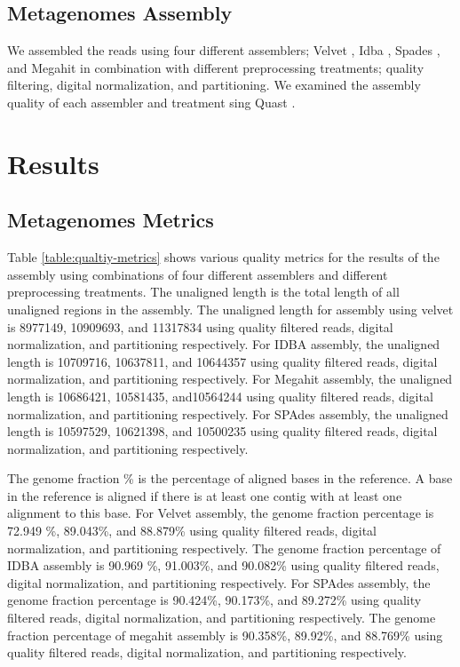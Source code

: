\subsection*{Metagenomes Assembly}
We assembled the reads using four different assemblers; Velvet \cite{velvet}, Idba \cite{idba}, Spades \cite{spades}, and Megahit \cite{megahit} in combination with different preprocessing treatments;   quality filtering, digital normalization, and partitioning. We examined the assembly quality of each assembler and treatment sing Quast \cite{quast}. 

\section*{Results}

\subsection*{Metagenomes Metrics}   
Table \ref {table:qualtiy-metrics} shows various quality metrics for the results of the assembly using combinations of four different assemblers and different preprocessing treatments.
The unaligned length is the total length of all unaligned regions in the assembly.  The unaligned length for assembly using velvet is 8977149, 10909693, and 11317834 using quality filtered reads, digital normalization, and partitioning respectively. For IDBA assembly, the unaligned length is 10709716, 10637811, and 10644357 using quality filtered reads, digital normalization, and partitioning respectively. For Megahit assembly, the unaligned length is 10686421, 10581435, and10564244 using quality filtered reads, digital normalization, and partitioning respectively.   For SPAdes assembly, the unaligned length is 10597529, 10621398, and 10500235 using quality filtered reads, digital normalization, and partitioning respectively. 

The genome fraction \% is the percentage of aligned bases in the reference. A base in the reference is aligned if there is at least one contig with at least one alignment to this base. For Velvet assembly,  the genome fraction percentage is 72.949 \%, 89.043\%, and 88.879\%  using quality filtered reads, digital normalization, and partitioning respectively. The genome fraction percentage of IDBA assembly is 90.969 \%, 91.003\%, and 90.082\% using quality filtered reads, digital normalization, and partitioning respectively.  For SPAdes assembly, the genome fraction percentage is 90.424\%, 90.173\%, and 89.272\% using quality filtered reads, digital normalization, and partitioning respectively. The genome fraction percentage of megahit assembly is 90.358\%, 89.92\%, and 88.769\% using quality filtered reads, digital normalization, and partitioning respectively. 
 
